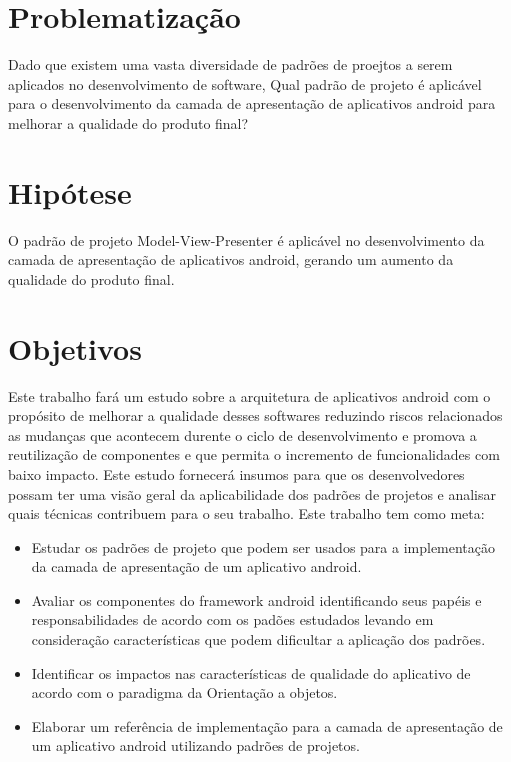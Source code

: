 \section{Problematização}
Dado que existem uma vasta diversidade de padrões de proejtos a serem aplicados
no desenvolvimento de software, Qual padrão de projeto é aplicável para o
desenvolvimento da camada de apresentação de aplicativos android para melhorar a
qualidade do produto final?

\section{Hipótese}

O padrão de projeto Model-View-Presenter é aplicável no desenvolvimento da
camada de apresentação de aplicativos android, gerando um aumento da qualidade
do produto final.

\section{Objetivos}

Este trabalho fará um estudo sobre a arquitetura de aplicativos android com o
propósito de melhorar a qualidade desses softwares reduzindo riscos relacionados
as mudanças que acontecem durente o ciclo de desenvolvimento e promova a
reutilização de componentes e que permita o incremento de funcionalidades com
baixo impacto. Este estudo fornecerá insumos para que os desenvolvedores possam
ter uma visão geral da aplicabilidade dos padrões de projetos e analisar quais
técnicas contribuem para o seu trabalho. Este trabalho tem como meta:

\begin{itemize}
\item Estudar os padrões de projeto que podem ser usados para a implementação da
camada de apresentação de um aplicativo android.
\item Avaliar os componentes do  framework android identificando seus papéis e
responsabilidades de acordo com os padões estudados levando  em consideração
características que podem dificultar a aplicação dos padrões. 
\item Identificar os impactos nas características de qualidade do aplicativo de acordo
com o paradigma da Orientação a objetos.
\item Elaborar um referência de implementação para a  camada de apresentação de um
aplicativo android utilizando padrões de projetos.
\end{itemize}

